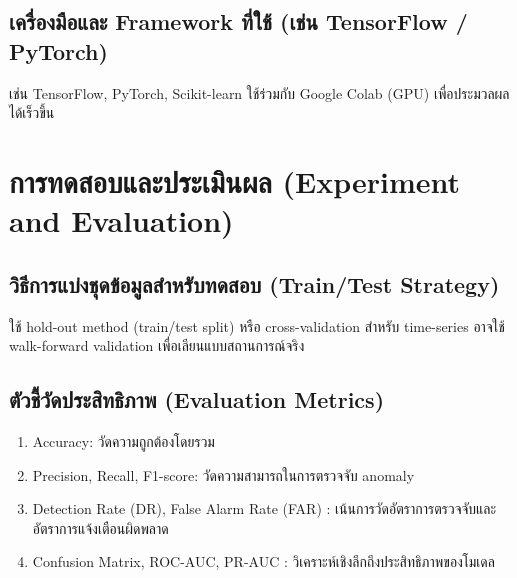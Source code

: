 \subsection{เครื่องมือและ Framework ที่ใช้ (เช่น TensorFlow / PyTorch)}
\hspace{2em} เช่น TensorFlow, PyTorch, Scikit-learn ใช้ร่วมกับ Google Colab (GPU) เพื่อประมวลผลได้เร็วขึ้น

\section{การทดสอบและประเมินผล (Experiment and Evaluation)}

\subsection{วิธีการแบ่งชุดข้อมูลสำหรับทดสอบ (Train/Test Strategy)}
\hspace{2em} ใช้ hold-out method (train/test split) หรือ cross-validation สำหรับ time-series อาจใช้ walk-forward validation เพื่อเลียนแบบสถานการณ์จริง

\subsection{ตัวชี้วัดประสิทธิภาพ (Evaluation Metrics)}
\begin{enumerate}
  \item Accuracy: วัดความถูกต้องโดยรวม
  \item Precision, Recall, F1-score: วัดความสามารถในการตรวจจับ anomaly
  \item Detection Rate (DR), False Alarm Rate (FAR) : เน้นการวัดอัตราการตรวจจับและอัตราการแจ้งเตือนผิดพลาด
  \item Confusion Matrix, ROC-AUC, PR-AUC : วิเคราะห์เชิงลึกถึงประสิทธิภาพของโมเดล

\end{enumerate}